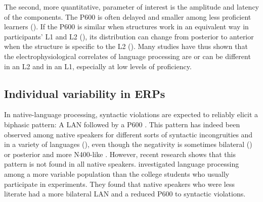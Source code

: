 \documentclass[output=paper,colorlinks,citecolor=brown,modfonts,nonflat]{../langscibook}
\begin{document}
The second, more quantitative, parameter of interest is the amplitude and latency of the components. The P600 is often delayed and smaller among less proficient learners (\citealt{RossiEtAl2006,McLaughlinEtAl2010,WhiteEtAl2012,BatterinkNeville2013,TannerEtAl2014}). If the P600 is similar when structures work in an equivalent way in participants’ L1 and L2 (\citealt{TokowiczMacWhinney2005,FoucartFrenck-Mestre2010}), its distribution can change from posterior to anterior when the structure is specific to the L2 (\citealt{FoucartFrenck-Mestre2012}). Many studies have thus shown that the electrophysiological correlates of language processing are or can be different in an L2 and in an L1, especially at low levels of proficiency.

\subsection{Individual variability in ERPs}
In native-language processing, syntactic violations are expected to reliably elicit a biphasic pattern: A LAN followed by a P600 \citep{Friederici2002}. This pattern has indeed been observed among native speakers for different sorts of syntactic incongruities and in a variety of languages (\citealt{OjimaEtAl2005,ChenEtAl2007,MuellerEtAl2007,NewmanEtAl2007,MolinaroEtAl2008,BowdenEtAl2013}), even though the negativity is sometimes bilateral (\citealt{IselKail2018}) or posterior and more N400-like \citep{ZawiszewskiEtAl2011}. However, recent research shows that this pattern is not found in all native speakers. \citet{PakulakNeville2010} investigated language processing among a more variable population than the college students who usually participate in experiments. They found that native speakers who were less literate had a more bilateral LAN and a reduced P600 to syntactic violations.
\end{document}
